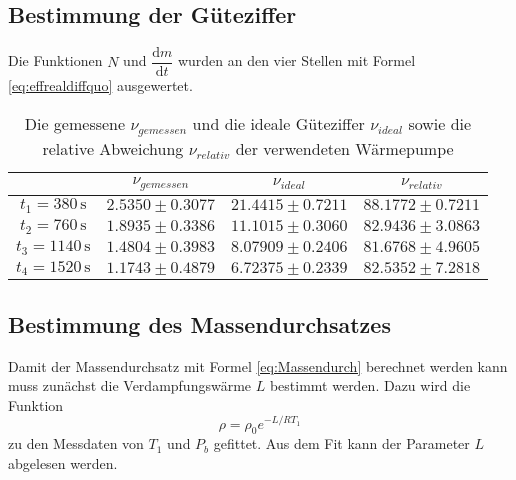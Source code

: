 \subsection{Bestimmung der Güteziffer}

Die Funktionen $N$ und $\dfrac{\text{d}m}{\text{d}t}$ wurden an den vier Stellen mit Formel \eqref{eq:effrealdiffquo} ausgewertet.

\begin{table}[H]
  \centering
  \label{tab:gueteziffer}
  \begin{tabular}{S S S S[table-format=2.4]}
    \toprule
    & {$ν_{gemessen}$} &  {$ν_{ideal}$} & {$ν_{relativ}$} \\
    \midrule
    {$t_1 = 380  \, \unit{\second}$} & {$2.5350 \pm 0.3077$} & {$21.4415 \pm 0.7211$} &  {$88.1772 \pm 0.7211$} \\
    {$t_2 = 760  \, \unit{\second}$} & {$1.8935 \pm 0.3386$} & {$11.1015 \pm 0.3060$} &   {$82.9436 \pm 3.0863$}\\            
    {$t_3 = 1140 \, \unit{\second}$} & {$1.4804 \pm 0.3983$} & {$8.07909 \pm 0.2406$} &  {$81.6768 \pm 4.9605$}\\
    {$t_4 = 1520 \, \unit{\second}$} & {$1.1743 \pm 0.4879$} & {$6.72375 \pm 0.2339$} &  {$82.5352\pm 7.2818$}\\
    \bottomrule
  \end{tabular}
  \caption{Die gemessene $ν_{gemessen}$ und die ideale Güteziffer $ν_{ideal}$ sowie die relative Abweichung $ν_{relativ}$ der verwendeten Wärmepumpe}
\end{table}

\subsection{Bestimmung des Massendurchsatzes}

Damit der Massendurchsatz mit Formel \eqref{eq:Massendurch} berechnet werden kann muss zunächst die Verdampfungswärme $L$ bestimmt werden.
Dazu wird die Funktion 
\begin{equation}
  \rho = \rho_0 e^{-L/R T_1}
\end{equation}
zu den Messdaten von $T_1$ und $P_b$ gefittet. Aus dem Fit kann der Parameter $L$ abgelesen werden.\\

